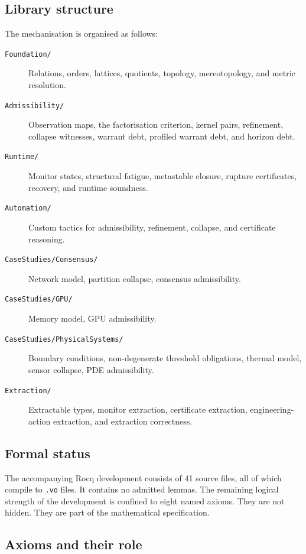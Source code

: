 \documentclass[a4paper,11pt]{article}
\begin{document}
\subsection{Library structure}

The mechanisation is organised as follows:

\begin{description}
\item[\texttt{Foundation/}] Relations, orders, lattices, quotients, topology,
mereotopology, and metric resolution.
\item[\texttt{Admissibility/}] Observation maps, the factorisation criterion,
kernel pairs, refinement, collapse witnesses, warrant debt, profiled warrant
debt, and horizon debt.
\item[\texttt{Runtime/}] Monitor states, structural fatigue, metastable closure,
rupture certificates, recovery, and runtime soundness.
\item[\texttt{Automation/}] Custom tactics for admissibility, refinement,
collapse, and certificate reasoning.
\item[\texttt{CaseStudies/Consensus/}] Network model, partition collapse,
consensus admissibility.
\item[\texttt{CaseStudies/GPU/}] Memory model, GPU admissibility.
\item[\texttt{CaseStudies/PhysicalSystems/}] Boundary conditions,
non-degenerate threshold obligations, thermal model, sensor collapse, PDE
admissibility.
\item[\texttt{Extraction/}] Extractable types, monitor extraction, certificate
extraction, engineering-action extraction, and extraction correctness.
\end{description}

\subsection{Formal status}

The accompanying Rocq development consists of 41 source files, all of which
compile to \texttt{.vo} files. It contains no admitted lemmas. The remaining
logical strength of the development is confined to eight named axioms. They are
not hidden. They are part of the mathematical specification.

\subsection{Axioms and their role}
\label{subsec:axioms-role}
\end{document}
